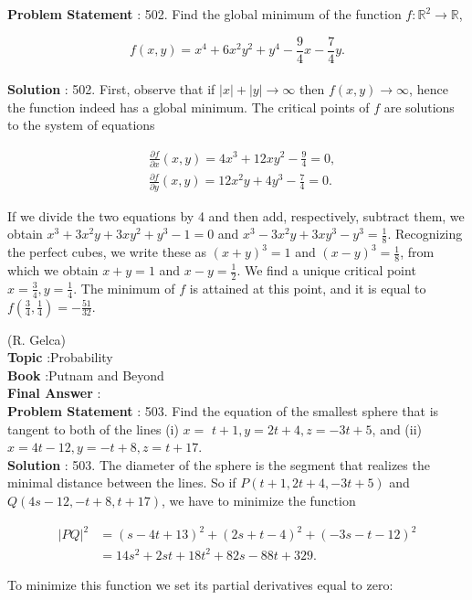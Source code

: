\documentclass[10pt]{article}
\begin{document}
\textbf{Problem Statement} :
502. Find the global minimum of the function $f: \mathbb{R}^{2} \rightarrow \mathbb{R}$, 

$$
f(x, y)=x^{4}+6 x^{2} y^{2}+y^{4}-\frac{9}{4} x-\frac{7}{4} y .
$$
\\
\textbf{Solution} :
502. First, observe that if $|x|+|y| \rightarrow \infty$ then $f(x, y) \rightarrow \infty$, hence the function indeed has a global minimum. The critical points of $f$ are solutions to the system of equations

$$
\begin{aligned}
&\frac{\partial f}{\partial x}(x, y)=4 x^{3}+12 x y^{2}-\frac{9}{4}=0, \\
&\frac{\partial f}{\partial y}(x, y)=12 x^{2} y+4 y^{3}-\frac{7}{4}=0 .
\end{aligned}
$$

If we divide the two equations by 4 and then add, respectively, subtract them, we obtain $x^{3}+3 x^{2} y+3 x y^{2}+y^{3}-1=0$ and $x^{3}-3 x^{2} y+3 x y^{3}-y^{3}=\frac{1}{8}$. Recognizing the perfect cubes, we write these as $(x+y)^{3}=1$ and $(x-y)^{3}=\frac{1}{8}$, from which we obtain $x+y=1$ and $x-y=\frac{1}{2}$. We find a unique critical point $x=\frac{3}{4}, y=\frac{1}{4}$. The minimum of $f$ is attained at this point, and it is equal to $f\left(\frac{3}{4}, \frac{1}{4}\right)=-\frac{51}{32}$.

(R. Gelca)
\\
\textbf{Topic} :Probability\\
\textbf{Book} :Putnam and Beyond\\
\textbf{Final Answer} :\\


\textbf{Problem Statement} :
503. Find the equation of the smallest sphere that is tangent to both of the lines (i) $x=$ $t+1, y=2 t+4, z=-3 t+5$, and (ii) $x=4 t-12, y=-t+8, z=t+17$.
\\
\textbf{Solution} :
503. The diameter of the sphere is the segment that realizes the minimal distance between the lines. So if $P(t+1,2 t+4,-3 t+5)$ and $Q(4 s-12,-t+8, t+17)$, we have to minimize the function

$$
\begin{aligned}
|P Q|^{2} &=(s-4 t+13)^{2}+(2 s+t-4)^{2}+(-3 s-t-12)^{2} \\
&=14 s^{2}+2 s t+18 t^{2}+82 s-88 t+329 .
\end{aligned}
$$

To minimize this function we set its partial derivatives equal to zero:
\end{document}
